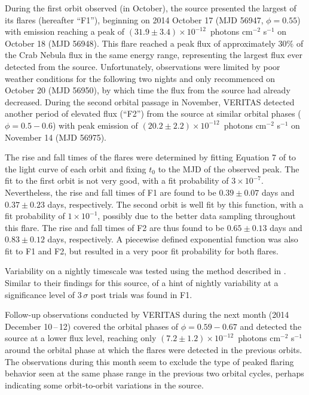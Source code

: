 \documentclass[preprint2]{aastex}
\newcommand{\tapp}{\raisebox{0.5ex}{\texttildelow}}
\newcommand{\pflux}{~photons cm$^{-2}$ s$^{-1}$}
\begin{document}
During the first orbit observed (in October), the source presented the largest of its flares (hereafter ``F1''), beginning on 2014 October 17 (MJD 56947, $\phi = 0.55$) with emission reaching a peak of $(31.9 \pm 3.4) \times10^{-12}$\pflux{} on October 18 (MJD 56948). This flare reached a peak flux of approximately $30\%$ of the Crab Nebula flux in the same energy range, representing the largest flux ever detected from the source. Unfortunately, observations were limited by poor weather conditions for the following two nights and only recommenced on October 20 (MJD 56950), by which time the flux from the source had already decreased. During the second orbital passage in November, VERITAS detected another period of elevated flux (``F2'') from the source at similar orbital phases ($\phi = 0.5-0.6$) with peak emission of $(20.2 \pm 2.2) \times10^{-12}$\pflux{} on November 14 (MJD 56975).

The rise and fall times of the flares were determined by fitting Equation 7 of \citet{2010ApJ...722..520A} to the light curve of each orbit and fixing $t_0$ to the MJD of the observed peak. The fit to the first orbit is not very good, with a fit probability of $3 \times 10^{-7}$. Nevertheless, the rise and fall times of F1 are found to be $0.39 \pm 0.07$ days and $0.37 \pm 0.23$ days, respectively. The second orbit is well fit by this function, with a fit probability of $1 \times 10^{-1}$, possibly due to the better data sampling throughout this flare. The rise and fall times of F2 are thus found to be $0.65 \pm 0.13$ days and $0.83 \pm 0.12$ days, respectively. A piecewise defined exponential function was also fit to F1 and F2, but resulted in a very poor fit probability for both flares. %

Variability on a nightly timescale was tested using the method described in \citet{2013ApJ...779...88A}. Similar to their findings for this source, of a hint of nightly variability at a significance level of \tapp{}$3\,\sigma$ post trials was found in F1.

Follow-up observations conducted by VERITAS during the next month (2014 December 10\,--\,12) covered the orbital phases of $\phi=0.59-0.67$ and detected the source at a lower flux level, reaching only $(7.2 \pm 1.2) \times10^{-12}$\pflux{} around the orbital phase at which the flares were detected in the previous orbits. The observations during this month seem to exclude the type of peaked flaring behavior seen at the same phase range in the previous two orbital cycles, perhaps indicating some orbit-to-orbit variations in the source.
\end{document}
